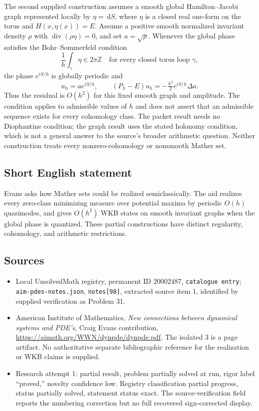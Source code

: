 \documentclass[11pt]{article}
\newcommand{\Z}{\mathbb{Z}}
\newcommand{\dd}{\,\mathrm{d}}
\begin{document}
The second supplied construction assumes a smooth global Hamilton--Jacobi graph represented locally by $\eta=\dd S$, where $\eta$ is a closed real one-form on the torus and $H(x,\eta(x))=E$. Assume a positive smooth normalized invariant density $\rho$ with $\operatorname{div}(\rho\eta)=0$, and set $a=\sqrt\rho$. Whenever the global phase satisfies the Bohr--Sommerfeld condition
\[
\frac1h\int_\gamma\eta\in2\pi\Z\quad\text{for every closed torus loop }\gamma,
\]
the phase $e^{iS/h}$ is globally periodic and
\[
u_h=a e^{iS/h},\qquad
(P_h-E)u_h=-\tfrac{h^2}{2}e^{iS/h}\Delta a.
\]
Thus the residual is $O(h^2)$ for this fixed smooth graph and amplitude. The condition applies to admissible values of $h$ and does not assert that an admissible sequence exists for every cohomology class. The packet result needs no Diophantine condition; the graph result uses the stated holonomy condition, which is not a general answer to the source's broader arithmetic question. Neither construction treats every nonzero-cohomology or nonsmooth Mather set.
\subsection{Short English statement}
Evans asks how Mather sets could be realized semiclassically. The aid realizes every zero-class minimizing measure over potential maxima by periodic $O(h)$ quasimodes, and gives $O(h^2)$ WKB states on smooth invariant graphs when the global phase is quantized. These partial constructions have distinct regularity, cohomology, and arithmetic restrictions.
\subsection{Sources}
\begin{itemize}
\item Local UnsolvedMath registry, permanent ID $20002487$, \texttt{catalogue entry}; \texttt{aim-pdes-notes.json}, \texttt{notes[98]}, extracted source item 1, identified by supplied verification as Problem 31.
\item American Institute of Mathematics, \emph{New connections between dynamical systems and PDE's}, Craig Evans contribution, \url{https://aimath.org/WWN/dynpde/dynpde.pdf}. The isolated $3$ is a page artifact. No authoritative separate bibliographic reference for the realization or WKB claims is supplied.
\item Research attempt 1: partial result, problem partially solved at run, rigor label ``proved,'' novelty confidence low. Registry classification partial progress, status partially solved, statement status exact. The source-verification field reports the numbering correction but no full recovered sign-corrected display.
\end{itemize}
\end{document}
